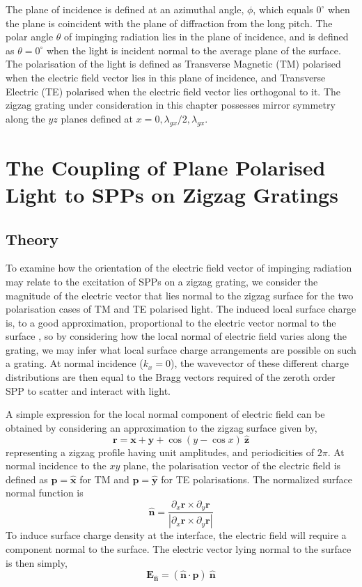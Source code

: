 The plane of incidence is defined at an azimuthal angle, $\phi$, which equals $0^\circ$ when the plane is coincident with the plane of diffraction from the long pitch. The polar angle $\theta$ of impinging radiation lies in the plane of incidence, and is defined as $\theta=0^\circ$ when the light is incident normal to the average plane of the surface. The polarisation of the light is defined as Transverse Magnetic (TM) polarised when the electric field vector lies in this plane of incidence, and Transverse Electric (TE) polarised when the electric field vector lies orthogonal to it. The zigzag grating under consideration in this chapter possesses mirror symmetry along the $yz$ planes defined at $x=0,\lambda_{gx}/2, \lambda_{gx}$. 


\section{The Coupling of Plane Polarised Light to SPPs on Zigzag Gratings}
\subsection{Theory\label{sec:zztheory}}
To examine how the orientation of the electric field vector of impinging radiation may relate to the excitation of SPPs on a zigzag grating, we consider the magnitude of the electric vector that lies normal to the zigzag surface for the two polarisation cases of TM and TE polarised light. The induced local surface charge is, to a good approximation, proportional to the electric vector normal to the surface \cite{Watts1997}, so by considering how the local normal of electric field varies along the grating, we may infer what local surface charge arrangements are possible on such a grating. At normal incidence ($k_x=0$), the wavevector of these different charge distributions are then equal to the Bragg vectors required of the zeroth order SPP to scatter and interact with light.

A simple expression for the local normal component of electric field can be obtained by considering an approximation to the zigzag surface given by,
\begin{equation}
\mathbf{r}=\mathbf{x}+\mathbf{y}+\cos{(y-\cos{x})\:\mathbf{\hat{z}}}
\end{equation}
representing a zigzag profile having unit amplitudes, and periodicities of $2\pi$. At normal incidence to the $xy$ plane, the polarisation vector of the electric field is defined as $\mathbf{p}=\mathbf{\hat{x}}$ for TM and $\mathbf{p}=\mathbf{\hat{y}}$ for TE polarisations. The normalized surface normal function is
\begin{equation}
\mathbf{\hat{n}}=\frac{\partial_x\mathbf{r}\times\partial_y\mathbf{r}}{|\partial_x\mathbf{r}\times\partial_y\mathbf{r}|}
\end{equation}
To induce surface charge density at the interface, the electric field will require a component normal to the surface. The electric vector lying normal to the surface is then simply,
\begin{equation}
\mathbf{E}_{\mathbf{\hat{n}}}=(\mathbf{\hat{n}}\cdot\mathbf{p})\:\mathbf{\hat{n}}
\end{equation}

